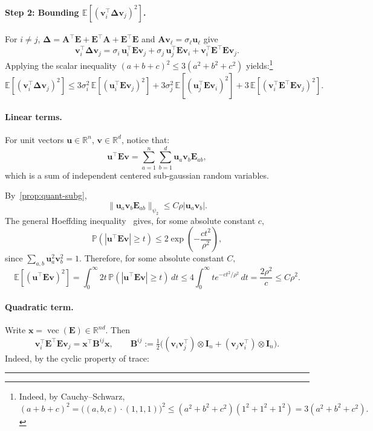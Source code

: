 \documentclass{article}
\newcommand{\Ex}[1]{\mbox{}\mathbb{E}\left[#1\right]}
\newcommand{\pr}[1]{\mbox{}\mathbb{P}\left(#1\right)}
\newcommand{\ts}{\top}
\newcommand{\R}{\mathbb{R}} %
\newcommand{\ub}{\mathbf{u}}
\newcommand{\vb}{\mathbf{v}}
\newcommand{\xb}{\mathbf{x}}
\newcommand{\Ab}{\mathbf{A}}
\newcommand{\Bb}{\mathbf{B}}
\newcommand{\Eb}{\mathbf{E}}
\newcommand{\Ib}{\mathbf{I}}
\newcommand{\BlackBox}{\rule{1.5ex}{1.5ex}}  %
\newenvironment{proof}{\par\noindent{\bf Proof\ }}{\hfill\BlackBox\par\medskip}
\newcommand{\vect}{\mathop{\mathrm{vec}}}
\newcommand{\rbr}[1]{\left(#1\right)}
\newcommand{\abr}[1]{\left|#1\right|}
\newcommand{\norm}[1]{\|#1\|}
\newcommand{\Deltab}{\boldsymbol{\Delta}}
\begin{document}
\begin{proof}
\paragraph{Step 2: Bounding $\Ex{(\vb_i^\ts\Deltab\vb_j)^2}$.}
For $i\ne j$, $\Deltab = \Ab^\ts \Eb + \Eb^\ts \Ab + \Eb^\ts \Eb$ and $\Ab\vb_\ell = \sigma_\ell\ub_\ell$ give
\begin{equation*}
    \vb_i^\ts\Deltab\vb_j = \sigma_i\,\ub_i^\ts \Eb \vb_j + \sigma_j\,\ub_j^\ts \Eb \vb_i + \vb_i^\ts \Eb^\ts \Eb \vb_j.
\end{equation*}
Applying the scalar inequality $(a+b+c)^2 \le 3(a^2+b^2+c^2)$ yields:\footnote{Indeed, by Cauchy--Schwarz,
$(a+b+c)^2=\bigl((a,b,c)\cdot(1,1,1)\bigr)^2\le (a^2+b^2+c^2)(1^2+1^2+1^2)=3(a^2+b^2+c^2).$}
\begin{equation}\label{eq:vidv-split}
    \Ex{(\vb_i^\ts\Deltab\vb_j)^2} \le 3\sigma_i^2\,\Ex{(\ub_i^\ts \Eb \vb_j)^2} + 3\sigma_j^2\,\Ex{(\ub_j^\ts \Eb \vb_i)^2} + 3\,\Ex{(\vb_i^\ts \Eb^\ts \Eb \vb_j)^2}.
\end{equation}

\paragraph{Linear terms.}
For unit vectors $\ub\in\R^n$, $\vb\in\R^d$, notice that:
\begin{equation}
    \ub^\ts \Eb \vb = \sum_{a=1}^n \sum_{b=1}^d \ub_a\vb_b\Eb_{ab},
\end{equation}
which is a sum of independent centered sub-gaussian random variables.

By~\eqref{prop:quant-subg}, 
\begin{equation}
    \norm{\ub_a\vb_b\Eb_{ab}}_{\psi_2}\le C\rho\abr{\ub_a\vb_b}.
\end{equation}
The general Hoeffding inequality~\citep[Theorem~2.7.3]{Vershynin_2026} gives, for some absolute constant $c$,
\begin{equation*}
    \pr{\abr{\ub^\ts \Eb \vb}\ge t} \le 2\exp\rbr{-\frac{ct^2}{\rho^2}},
\end{equation*}
since $\sum_{a,b}\ub_a^2\vb_b^2 = 1$. Therefore, for some absolute constant $C,$
\begin{equation*}
    \Ex{(\ub^\ts \Eb \vb)^2} = \int_0^\infty 2t\,\pr{\abr{\ub^\ts \Eb \vb}\ge t}\,dt \le 4\int_0^\infty t e^{-ct^2/\rho^2}\,dt = \frac{2\rho^2}{c} \le C\rho^2.
\end{equation*}

\paragraph{Quadratic term.}
Write $\xb=\vect(\Eb)\in\R^{nd}$. Then
\begin{equation*}
    \vb_i^\ts \Eb^\ts \Eb \vb_j = \xb^\ts \Bb^{ij}\xb, \qquad \Bb^{ij} := \tfrac{1}{2}\bigl((\vb_i\vb_j^\ts)\otimes \Ib_n + (\vb_j\vb_i^\ts)\otimes \Ib_n\bigr).
\end{equation*}
Indeed, by the cyclic property of trace:


\end{proof}
\end{document}
